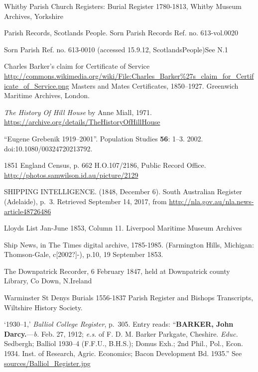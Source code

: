 \begin{thebibliography}{99}
	Whitby Parish Church Registers: Burial Register 1780-1813, Whitby Museum Archives, Yorkshire

	Parish Records, Scotlands People. Sorn Parish Records Ref. no. 613-vol.0020

	Sorn Parish Ref. no. 613-0010 (accessed 15.9.12, ScotlandsPeople)See N.1

	Charles Barker's claim for Certificate of Service
	\url{http://commons.wikimedia.org/wiki/File:Charles_Barker\%27s_claim_for_Certificate_of_Service.png}
	Masters and Mates Certificates, 1850--1927. Greenwich Maritime Archives, London.

	\emph{The History Of Hill House} by Anne Miall, 1971.
	\url{https://archive.org/details/TheHistoryOfHillHouse}

``Eugene Grebenik 1919--2001''. Population Studies \textbf{56}: 1--3. 2002. doi:10.1080/00324720213792.

	1851 England Census, p. 662 H.O.107/2186, Public Record Office.
	\url{http://photos.samwilson.id.au/picture/2129}

	SHIPPING INTELLIGENCE. (1848, December 6). South Australian Register (Adelaide), p.~3.
	Retrieved September 14, 2017, from \url{http://nla.gov.au/nla.news-article48726486}

	Lloyds List Jan-June 1853, Column 11.  Liverpool Maritime Museum Archives

	Ship News, in The Times digital archive, 1785-1985. (Farmington Hills, Michigan: Thomson-Gale, c[2002?]-), 	p.10, 19 September 1853.

	The Downpatrick Recorder, 6 February 1847, held at Downpatrick county Library, Co Down, N.Ireland

	Warminster St Denys Burials 1556-1837 Parish Register and Bishops Transcripts, Wiltshire History Society.

	`1930--1,' \emph{Balliol College Register}, p.~305. Entry reads:
	``\textbf{BARKER, John Darcy.}---\emph{b.} Feb. 27, 1912; \emph{e.s.} of F. D. M. Barker Parkgate, Cheshire. \emph{Educ.} Sedbergh; Balliol 1930--4 (F.F.U., B.H.S.); Domus Exh.; 2nd Phil., Pol., Econ. 1934. Inst. of Research, Agric. Economics; Bacon Development Bd. 1935.''
	See \url{sources/Balliol_Register.jpg}


\end{thebibliography}
